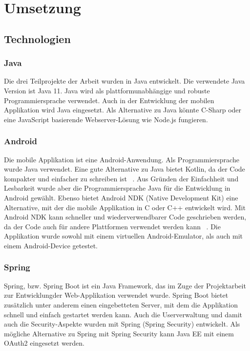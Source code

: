 \chapter{Umsetzung}
\label{chap:Umsetzung}

\section{Technologien}
\subsection{Java}
Die drei Teilprojekte der Arbeit wurden in Java entwickelt. Die verwendete Java Version ist Java 11. Java wird als plattformunabhängige und robuste Programmiersprache verwendet. Auch in der Entwicklung der mobilen Applikation wird Java eingesetzt. Als Alternative zu Java könnte C-Sharp oder eine JavaScript basierende Webserver-Lösung wie Node.js fungieren.
\subsection{Android}
Die mobile Applikation ist eine Android-Anwendung. Als Programmiersprache wurde Java verwendet. Eine gute Alternative zu Java bietet Kotlin, da der Code kompakter und einfacher zu schreiben ist ~\parencite{banerjee2018comparative}. Aus Gründen der Einfachheit und Lesbarkeit wurde aber die Programmiersprache Java für die Entwicklung in Android gewählt. Ebenso bietet Android NDK (Native Development Kit) eine Alternative, mit der die mobile Applikation in C oder C++ entwickelt wird. Mit Android NDK kann schneller und wiederverwendbarer Code geschrieben werden, da der Code auch für andere Plattformen verwendet werden kann ~\parencite{ratabouil2015android}. Die Applikation wurde sowohl mit einem virtuellen Android-Emulator, als auch mit einem Android-Device getestet.
\subsection{Spring}
Spring, bzw. Spring Boot ist ein Java Framework, das im Zuge der Projektarbeit zur Entwicklungder Web-Applikation verwendet wurde. Spring Boot bietet zusätzlich unter anderem einen eingebetteten Server,  mit dem die Applikation schnell und einfach gestartet werden kann. Auch die Userverwaltung und damit auch die Security-Aspekte wurden mit Spring (Spring Security) entwickelt. Als mögliche Alternative zu Spring mit Spring Security kann Java EE mit einem OAuth2 eingesetzt werden. ~\parencite{pressmarSpring}
